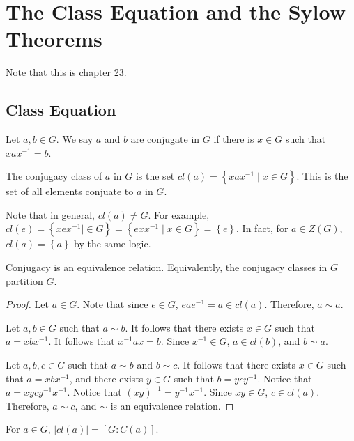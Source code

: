 \chapter{The Class Equation and the Sylow Theorems}
Note that this is chapter 23.
\section{Class Equation}
\begin{definition}[Conjugate]\label{dfn:jh}
	Let $a,b\in G$. We say $a$ and $b$ are conjugate in $G$ if there is $x\in G$ such that $xax^{-1}=b$.
\end{definition}

\begin{definition}\label{dfn:hhh}
	The conjugacy class of $a$ in $G$ is the set $cl(a)=\left\{ xax ^{-1} \mid x\in G \right\} $. This is the set of all elements conjuate to $a$ in $G$.
\end{definition}
Note that in general, $cl(a)\neq G$. For example, $cl(e)=\left\{ xex ^{-1} \mid \in G \right\} =\left\{ exx ^{-1} \mid x\in G \right\} =\left\{ e \right\} $. In fact, for $a\in Z(G)$, $cl(a)=\left\{ a \right\} $ by the same logic.
\begin{theorem}\label{thm:jhs}
	Conjugacy is an equivalence relation. Equivalently, the conjugacy classes in $G$ partition $G$.
\end{theorem}
\begin{proof}
	Let $a\in G$. Note that since $e\in G$, $eae^{-1}=a\in cl(a)$. Therefore, $a\sim a$.

	Let $a,b\in G$ such that $a\sim b$. It follows that there exists $x\in G$ such that $a=xbx ^{-1}$. It follows that $x ^{-1}ax=b$. Since $x ^{-1}\in G$, $a\in cl(b)$, and $b\sim a$.

	Let $a,b,c\in G$ such that $a\sim b$ and $b\sim c$. It follows that there exists $x\in G$ such that $a = xbx ^{-1}$, and there exists $y\in G$ such that $b=ycy ^{-1}$. Notice that $a = xycy ^{-1}x ^{-1}$. Notice that $\left( xy \right) ^{-1}=y^{-1}x ^{-1}	$. Since $xy\in G$, $c\in cl(a)$. Therefore, $a\sim c$, and $\sim $ is an equivalence relation.
\end{proof}
\begin{theorem}\label{thm:kjhashj}
	For $a\in G$, $\left| cl(a) \right| =\left[ G : C(a) \right] $.
\end{theorem}

